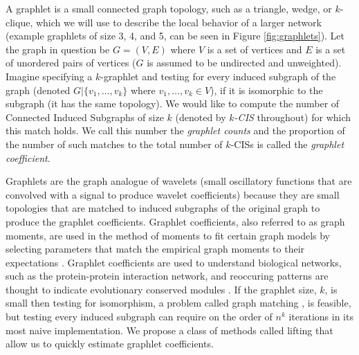 	
	A graphlet is a small connected graph topology, such as a triangle, wedge, or $k$-clique, which we will use to describe the local behavior of a larger network (example graphlets of size 3, 4, and 5, can be seen in Figure \ref{fig:graphlets}).
	Let the graph in question be $G = (V,E)$ where $V$ is a set of vertices and $E$ is a set of unordered pairs of vertices ($G$ is assumed to be undirected and unweighted).
	Imagine specifying a $k$-graphlet and testing for every induced subgraph of the graph (denoted $G|\{v_1,\ldots,v_k\}$ where $v_1,\ldots,v_k \in V$), if it is isomorphic to the subgraph (it has the same topology).
	We would like to compute the number of Connected Induced Subgraphs of size $k$ (denoted by {\em $k$-CIS} throughout) for which this match holds.
	We call this number the {\em graphlet counts} and the proportion of the number of such matches to the total number of $k$-CISs is called the {\em graphlet coefficient}.
	
    Graphlets are the graph analogue of wavelets (small oscillatory functions that are convolved with a signal to produce wavelet coefficients) because they are small topologies that are matched to induced subgraphs of the original graph to produce the graphlet coefficients.
	Graphlet coefficients, also referred to as graph moments, are used in the method of moments to fit certain graph models by selecting parameters that match the empirical graph moments to their expectations \cite{bickel2011method}.
	Graphlet coefficients are used to understand biological networks, such as the protein-protein interaction network, and reoccuring patterns are thought to indicate evolutionary conserved modules \cite{prvzulj2006efficient}. 
	If the graphlet size, $k$, is small then testing for isomorphism, a problem called graph matching \cite{cordella2004sub}, is feasible, but testing every induced subgraph can require on the order of $n^k$ iterations in its most naive implementation.
	We propose a class of methods called lifting that allow us to quickly estimate graphlet coefficients.

	
